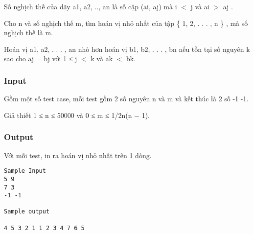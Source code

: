 

Số nghịch thế của dãy a1, a2, .., an là số cặp (ai, aj) mà i $<$ j và ai $>$ aj .

Cho n và số nghịch thế m, tìm hoán vị nhỏ nhất của tập \{ 1, 2, . . . , n \} , mà số nghịch thế là m.

Hoán vị a1, a2, . . . , an nhỏ hơn hoán vị b1, b2, . . . , bn nếu tồn tại số nguyên k sao cho aj = bj với 1 ≤ j $<$ k và ak $<$ bk.

\subsubsection{Input}

Gồm một số test case, mỗi test gồm 2 số nguyên n và m và kết thúc là 2 số -1 -1.


Giả thiết 1 ≤ n ≤ 50000 và 0 ≤ m ≤ 1/2n(n − 1).

\subsubsection{Output}

Với mỗi test, in ra hoán vị nhỏ nhất trên 1 dòng.
\begin{verbatim}
Sample Input
5 9
7 3
-1 -1

Sample output

4 5 3 2 1 1 2 3 4 7 6 5\end{verbatim}
